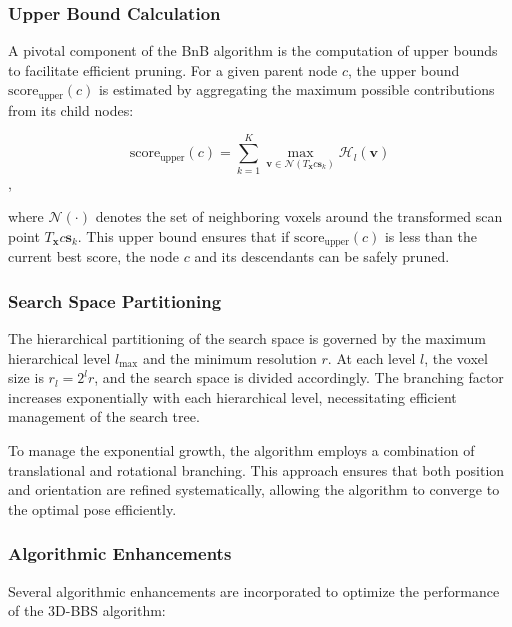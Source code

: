 \subsubsection{Upper Bound Calculation}
A pivotal component of the BnB algorithm is the computation of upper bounds to facilitate efficient pruning. For a given parent node $c$, the upper bound $\text{score}_{\text{upper}}(c)$ is estimated by aggregating the maximum possible contributions from its child nodes:

$$\text{score}_{\text{upper}}(c) = \sum_{k=1}^{K} \max_{\mathbf{v} \in \mathcal{N}(T_{\mathbf{x}}c \mathbf{s}_k)} \mathcal{H}_l(\mathbf{v})$$,

where $\mathcal{N}(\cdot)$ denotes the set of neighboring voxels around the transformed scan point $T_{\mathbf{x}}c \mathbf{s}_k$. This upper bound ensures that if $\text{score}_{\text{upper}}(c)$ is less than the current best score, the node $c$ and its descendants can be safely pruned.

\subsubsection{Search Space Partitioning}
The hierarchical partitioning of the search space is governed by the maximum hierarchical level $l_{\text{max}}$ and the minimum resolution $r$. At each level $l$, the voxel size is $r_l = 2^l r$, and the search space is divided accordingly. The branching factor increases exponentially with each hierarchical level, necessitating efficient management of the search tree.

To manage the exponential growth, the algorithm employs a combination of translational and rotational branching. This approach ensures that both position and orientation are refined systematically, allowing the algorithm to converge to the optimal pose efficiently.

\subsubsection{Algorithmic Enhancements}
Several algorithmic enhancements are incorporated to optimize the performance of the 3D-BBS algorithm:

